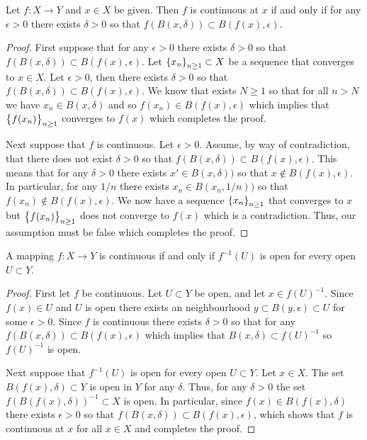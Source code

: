 \documentclass[11pt,a4paper]{article}
\begin{document}
\begin{proposition}
  Let $f \colon X \to Y$ and $x \in X$ be given. Then $f$ is continuous
  at $x$ if and only if for any $\epsilon > 0$ there exists $\delta > 0$
  so that $f(B(x,\delta)) \subset B(f(x),\epsilon)$.
\end{proposition}
\begin{proof}
  First suppose that for any $\epsilon > 0$ there exists $\delta > 0$
  so that $f(B(x,\delta)) \subset B(f(x),\epsilon)$.
  Let $\left\{x_n\right\}_{n \geq 1} \subset X$ be a sequence that converges to
  $x \in X$.
  Let $\epsilon > 0$, then there exists $\delta > 0$ so that
  $f(B(x,\delta)) \subset B(f(x),\epsilon)$.
  We know that exists $N \geq 1$ so that for all $n > N$ we have
  $x_n \in B(x,\delta)$ and so $f(x_n) \in B(f(x),\epsilon)$
  which implies that $\left\{f(x_n)\right\}_{n \geq 1}$ converges to $f(x)$
  which completes the proof.

  Next suppose that $f$ is continuous.
  Let $\epsilon > 0$.
  Assume, by way of contradiction, that there does not exist $\delta > 0$
  so that $f(B(x,\delta)) \subset B(f(x),\epsilon)$.
  This means that for any $\delta > 0$ there exists $x' \in B(x,\delta))$
  so that $x \notin B(f(x),\epsilon)$.
  In particular, for any $1/n$ there exists $x_n \in B(x_n,1/n))$
  so that $f(x_n) \notin B(f(x),\epsilon)$.
  We now have a sequence $\left\{x_n\right\}_{n \geq 1}$ that converges to $x$
  but $\left\{f(x_n)\right\}_{n \geq 1}$ does not converge to $f(x)$
  which is a contradiction.
  Thus, our assumption must be false which completes the proof.
\end{proof}

\begin{proposition}
  A mapping $f \colon X \to Y$ is continuous if and only if $f^{-1}(U)$
  is open for every open $U \subset Y$.
\end{proposition}
\begin{proof}
  First let $f$ be continuous.
  Let $U \subset Y$ be open, and let $x \in f(U)^{-1}$.
  Since $f(x) \in U$ and $U$ is open there exists an neighbourhood
  $y \subset B(y,\epsilon) \subset U$ for some $\epsilon > 0$.
  Since $f$ is continuous there exists $\delta > 0$ so that
  for any $f(B(x,\delta)) \subset B(f(x),\epsilon)$ which implies
  that $B(x,\delta) \subset f(U)^{-1}$ so $f(U)^{-1}$ is open.

  Next suppose that $f^{-1}(U)$ is open for every open $U \subset Y$.
  Let $x \in X$.
  The set $B(f(x),\delta) \subset Y$ is open in $Y$ for any $\delta$.
  Thus, for any $\delta > 0$ the set $f(B(f(x),\delta))^{-1} \subset X$
  is open.
  In particular, since $f(x) \in B(f(x),\delta)$
  there exists $\epsilon > 0$ so that
  $f(B(x,\delta)) \subset B(f(x),\epsilon)$,
  which shows that $f$ is continuous at $x$ for all $x \in X$
  and completes the proof.
\end{proof}
\end{document}
